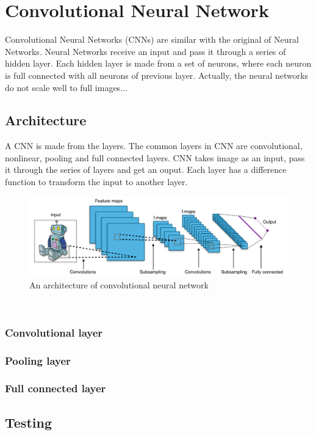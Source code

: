 \chapter{Convolutional Neural Network}
Convolutional Neural Networks (CNNs) are similar with the original of Neural Networks. Neural Networks receive an input and pass it through a series of hidden layer. Each hidden layer is made from a set of neurons, where each neuron is full connected with all neurons of previous layer. Actually, the neural networks do not scale well to full images...
\section{Architecture}
A CNN is made from the layers. The common layers in CNN are convolutional, nonlinear, pooling and full connected layers. CNN takes image as an input, pass it through the series of layers and get an ouput. Each layer has a difference function to transform the input to another layer. 
\begin{figure}[h]
	\centering
	\includegraphics[scale=0.45]{images/cnn_architecture}
	\caption{An architecture of convolutional neural network}
	\label{figlncex}
\end{figure}~\\
\subsection{Convolutional layer}
\subsection{Pooling layer}
\subsection{Full connected layer}
\section{Testing}